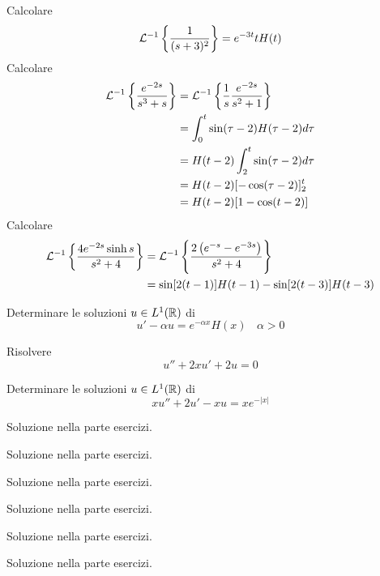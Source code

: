 Calcolare
\begin{equation*}
\mathcal{L}^{-1}\left\{\frac{1}{( s+3)^{2}}\right\} =e^{-3t} tH( t)
\end{equation*}
Calcolare
\begin{equation*}
\begin{aligned}
\mathcal{L}^{-1}\left\{\frac{e^{-2s}}{s^{3} +s}\right\} & =\mathcal{L}^{-1}\left\{\frac{1}{s}\frac{e^{-2s}}{s^{2} +1}\right\}\\
 & =\int ^{t}_{0}\sin( \tau -2) H( \tau -2) d\tau \\
 & =H( t-2)\int ^{t}_{2}\sin( \tau -2) d\tau \\
 & =H( t-2)[ -\cos( \tau -2)]^{t}_{2}\\
 & =H( t-2)[ 1-\cos( t-2)]
\end{aligned}
\end{equation*}
Calcolare
\begin{equation*}
\begin{aligned}
\mathcal{L}^{-1}\left\{\frac{4e^{-2s}\sinh s}{s^{2} +4}\right\} & =\mathcal{L}^{-1}\left\{\frac{2\left( e^{-s} -e^{-3s}\right)}{s^{2} +4}\right\}\\
 & =\sin[ 2( t-1)] H( t-1) -\sin[ 2( t-3)] H( t-3)
\end{aligned}
\end{equation*}
\Esercizio{}

Determinare le soluzioni $u\in L^{1}(\mathbb{R} )$ di
\begin{equation*}
u'-\alpha u=e^{-\alpha x} H( x) \ \ \ \ \alpha  >0
\end{equation*}
\Esercizio{}

Risolvere
\begin{equation*}
u''+2xu'+2u=0
\end{equation*}
\Esercizio{}

Determinare le soluzioni $u\in L^{1}(\mathbb{R} )$ di
\begin{equation*}
xu''+2u'-xu=xe^{-| x| }
\end{equation*}
\ParteSoluzioni
\Soluzione

Soluzione nella parte esercizi.
\Soluzione

Soluzione nella parte esercizi.
\Soluzione

Soluzione nella parte esercizi.
\Soluzione

Soluzione nella parte esercizi.
\Soluzione

Soluzione nella parte esercizi.
\Soluzione

Soluzione nella parte esercizi.
\Soluzione


